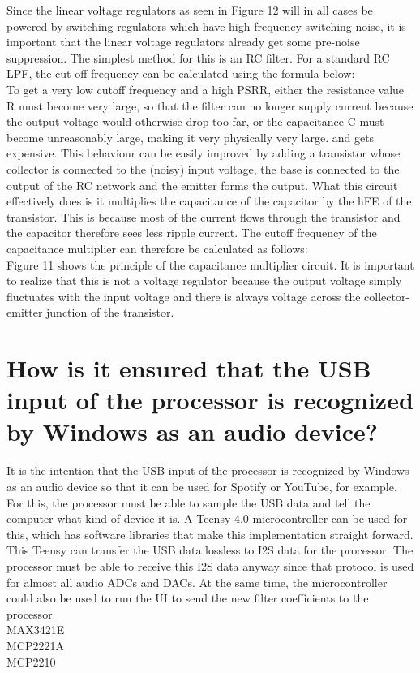 Since the linear voltage regulators as seen in Figure 12 will in all cases be powered by switching regulators which have high-frequency switching noise, it is important that the linear voltage regulators already get some pre-noise suppression. The simplest method for this is an RC filter. For a standard RC LPF, the cut-off frequency can be calculated using the formula below:\\
To get a very low cutoff frequency and a high PSRR, either the resistance value R must become very large, so that the filter can no longer supply current because the output voltage would otherwise drop too far, or the capacitance C must become unreasonably large, making it very physically very large. and gets expensive. This behaviour can be easily improved by adding a transistor whose collector is connected to the (noisy) input voltage, the base is connected to the output of the RC network and the emitter forms the output. What this circuit effectively does is it multiplies the capacitance of the capacitor by the hFE of the transistor. This is because most of the current flows through the transistor and the capacitor therefore sees less ripple current. The cutoff frequency of the capacitance multiplier can therefore be calculated as follows:\\
Figure 11 shows the principle of the capacitance multiplier circuit. It is important to realize that this is not a voltage regulator because the output voltage simply fluctuates with the input voltage and there is always voltage across the collector-emitter junction of the transistor.\\

        \section{How is it ensured that the USB input of the processor is recognized by Windows as an audio device?}
        It is the intention that the USB input of the processor is recognized by Windows as an audio device so that it can be used for Spotify or YouTube, for example. For this, the processor must be able to sample the USB data and tell the computer what kind of device it is. A Teensy 4.0 microcontroller can be used for this, which has software libraries that make this implementation straight forward. This Teensy can transfer the USB data lossless to I2S data for the processor. The processor must be able to receive this I2S data anyway since that protocol is used for almost all audio ADCs and DACs. At the same time, the microcontroller could also be used to run the UI to send the new filter coefficients to the processor.\\
        MAX3421E\\
        MCP2221A\\
        MCP2210\\




        






